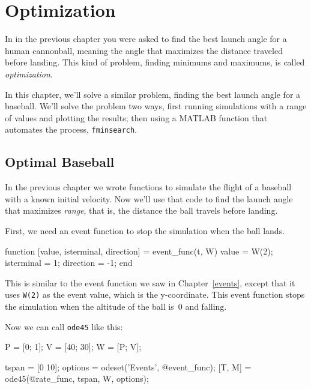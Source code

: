 \chapter{Optimization}

In  in the previous chapter you were asked to find the best launch angle for a human cannonball, meaning the angle that maximizes the distance traveled before landing.  This kind of problem, finding minimums and maximums, is called \emph{optimization}.

In this chapter, we'll solve a similar problem, finding the best launch angle for a baseball.
We'll solve the problem two ways, first running simulations with a range of values and plotting the results; then using a MATLAB function that automates the process, \lstinline{fminsearch}.

\section{Optimal Baseball}

In the previous chapter we wrote functions to simulate the flight of a baseball with a known initial velocity.  Now we'll use that code to find the launch angle that maximizes \emph{range}, that is, the distance the ball travels before landing.


First, we need an event function to stop the simulation when the ball lands.

\begin{code}
function [value, isterminal, direction] = event_func(t, W)
    value = W(2);
    isterminal = 1;
    direction = -1;
end
\end{code}


This is similar to the event function we saw in Chapter~\ref{events}, except that it uses \lstinline{W(2)} as the event value, which is the y-coordinate.  This event function stops the simulation when the altitude of the ball is~0 and falling.

Now we can call \lstinline{ode45} like this:

\begin{code}
    P = [0; 1];       %
    V = [40; 30];     %
    W = [P; V];       %
    
    tspan = [0 10];
    options = odeset('Events', @event_func);
    [T, M] = ode45(@rate_func, tspan, W, options);
\end{code}

